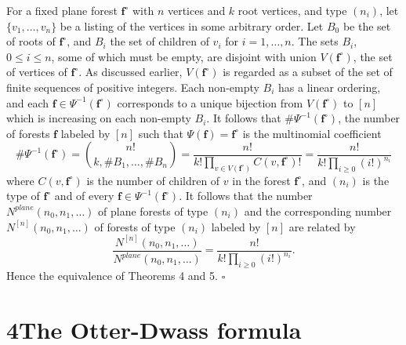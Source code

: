 For a fixed plane forest $\mathbf{f}^{\circ}$ with $n$ vertices and $k$ root vertices, and type $(n_i)$, let $\{v_1,\ldots,v_n\}$ be a listing of the vertices in some arbitrary order. Let $B_0$ be the set of roots of $\mathbf{f}^{\circ}$, and $B_i$ the set of children of $v_i$ for $i=1,\ldots,n$. The sets $B_i$, $0\le i\le n$, some of which must be empty, are disjoint with union $V(\mathbf{f}^{\circ})$, the set of vertices of $\mathbf{f}^{\circ}$. As discussed earlier, $V(\mathbf{f}^{\circ})$ is regarded as a subset of the set of finite sequences of positive integers. Each non-empty $B_i$ has a linear ordering, and each $\mathbf{f}\in\Psi^{-1}(\mathbf{f}^{\circ})$ corresponds to a unique bijection from $V(\mathbf{f}^{\circ})$ to $[n]$ which is increasing on each non-empty $B_i$. It follows that $\#\Psi^{-1}(\mathbf{f}^{\circ})$, the number of forests $\mathbf{f}$ labeled by $[n]$ such that $\Psi(\mathbf{f})=\mathbf{f}^{\circ}$ is the multinomial coefficient
\[
\#\Psi^{-1}(\mathbf{f}^{\circ})=\binom{n!}{k,\#B_1,\ldots,\#B_n}=\frac{n!}{k!\prod_{v\in V(\mathbf{f}^{\circ})} C(v,\mathbf{f}^{\circ})!}=\frac{n!}{k!\prod_{i\ge 0}(i!)^{n_i}} \tag{22}
\]
where $C(v,\mathbf{f}^{\circ})$ is the number of children of $v$ in the forest $\mathbf{f}^{\circ}$, and $(n_i)$ is the type of $\mathbf{f}^{\circ}$ and of every $\mathbf{f}\in\Psi^{-1}(\mathbf{f}^{\circ})$. It follows that the number $N^{\mathit{plane}}(n_0,n_1,\ldots)$ of plane forests of type $(n_i)$ and the corresponding number $N^{[n]}(n_0,n_1,\ldots)$ of forests of type $(n_i)$ labeled by $[n]$ are related by
\[
\frac{N^{[n]}(n_0,n_1,\ldots)}{N^{\mathit{plane}}(n_0,n_1,\ldots)}=\frac{n!}{k!\prod_{i\ge 0}(i!)^{n_i}}. \tag{23}
\]
Hence the equivalence of Theorems 4 and 5. \hfill$\square$

\section*{4\quad The Otter-Dwass formula}

